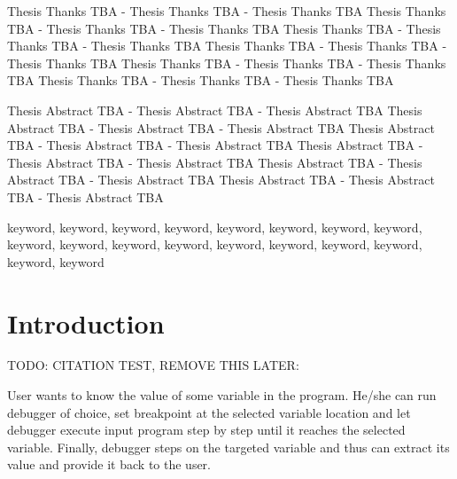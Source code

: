 \documentclass[12pt, twoside]{fithesis2}
\renewcommand{\_}{\leavevmode \kern0.07em\vbox{\hrule width0.4em}}
\begin{document}
\FrontMatter
\ThesisTitlePage






\begin{ThesisDeclaration}
    \DeclarationText
    \AdvisorName
\end{ThesisDeclaration}

\begin{ThesisThanks}
    Thesis Thanks TBA - Thesis Thanks TBA - Thesis Thanks TBA
    Thesis Thanks TBA - Thesis Thanks TBA - Thesis Thanks TBA
    Thesis Thanks TBA - Thesis Thanks TBA - Thesis Thanks TBA
    Thesis Thanks TBA - Thesis Thanks TBA - Thesis Thanks TBA
    Thesis Thanks TBA - Thesis Thanks TBA - Thesis Thanks TBA
    Thesis Thanks TBA - Thesis Thanks TBA - Thesis Thanks TBA
\end{ThesisThanks}

\begin{ThesisAbstract}
    Thesis Abstract TBA - Thesis Abstract TBA - Thesis Abstract TBA
    Thesis Abstract TBA - Thesis Abstract TBA - Thesis Abstract TBA
    Thesis Abstract TBA - Thesis Abstract TBA - Thesis Abstract TBA
    Thesis Abstract TBA - Thesis Abstract TBA - Thesis Abstract TBA
    Thesis Abstract TBA - Thesis Abstract TBA - Thesis Abstract TBA
    Thesis Abstract TBA - Thesis Abstract TBA - Thesis Abstract TBA
\end{ThesisAbstract}

\begin{ThesisKeyWords}
    keyword, keyword, keyword, keyword, keyword, keyword,
    keyword, keyword, keyword, keyword, keyword, keyword,
    keyword, keyword, keyword, keyword, keyword, keyword
\end{ThesisKeyWords}


\MainMatter
\tableofcontents

\chapter{Introduction}
\label{chap:intro}

TODO: CITATION TEST, REMOVE THIS LATER:

\cite{dg}
\cite{llvm}
\cite{llvm-passes}
\cite{llvm-writing-pass}
\cite{llvm-opt}

User wants to know the value of some variable in the program. He/she can run
debugger of choice, set breakpoint at the selected variable location and let
debugger execute input program step by step until it reaches the selected
variable. Finally, debugger steps on the targeted variable and thus can extract
its value and provide it back to the user.
\end{document}
